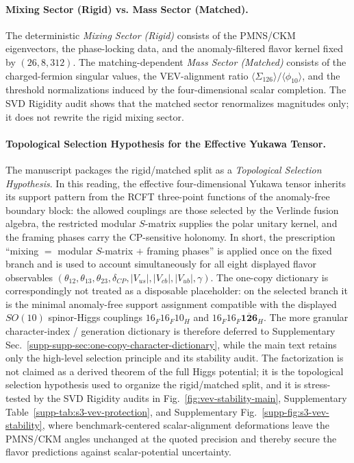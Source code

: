 \documentclass[11pt]{article}
\begin{document}
\paragraph{Mixing Sector (Rigid) vs. Mass Sector (Matched).}
The deterministic \emph{Mixing Sector (Rigid)} consists of the PMNS/CKM
eigenvectors, the phase-locking data, and the anomaly-filtered flavor kernel
fixed by $(26,8,312)$. The matching-dependent \emph{Mass Sector (Matched)}
consists of the charged-fermion singular values, the VEV-alignment ratio
$\langle \Sigma_{126} \rangle / \langle \phi_{10} \rangle$, and the threshold
normalizations induced by the four-dimensional scalar completion. The SVD Rigidity audit
shows that the matched sector renormalizes magnitudes only; it does not rewrite
the rigid mixing sector.

\paragraph{Topological Selection Hypothesis for the Effective Yukawa Tensor.}
The manuscript packages the rigid/matched split as a \emph{Topological Selection Hypothesis}. In this reading, the effective four-dimensional Yukawa tensor inherits its support pattern from the RCFT three-point functions of the anomaly-free boundary block: the allowed couplings are those selected by the Verlinde fusion algebra, the restricted modular $S$-matrix supplies the polar unitary kernel, and the framing phases carry the CP-sensitive holonomy. In short, the prescription ``mixing $=$ modular $S$-matrix $+$ framing phases'' is applied once on the fixed branch and is used to account simultaneously for all eight displayed flavor observables $(\theta_{12},\theta_{13},\theta_{23},\delta_{CP},|V_{us}|,|V_{cb}|,|V_{ub}|,\gamma)$. The one-copy dictionary is correspondingly not treated as a disposable placeholder: on the selected branch it is the minimal anomaly-free support assignment compatible with the displayed $SO(10)$ spinor-Higgs couplings $16_F16_F10_H$ and $16_F16_F\overline{\mathbf{126}}_H$. The more granular character-index / generation dictionary is therefore deferred to Supplementary Sec.~\ref{supp-supp-sec:one-copy-character-dictionary}, while the main text retains only the high-level selection principle and its stability audit. The factorization is not claimed as a derived theorem of the full Higgs potential; it is the topological selection hypothesis used to organize the rigid/matched split, and it is stress-tested by the SVD Rigidity audits in Fig.~\ref{fig:vev-stability-main}, Supplementary Table~\ref{supp-tab:s3-vev-protection}, and Supplementary Fig.~\ref{supp-fig:s3-vev-stability}, where benchmark-centered scalar-alignment deformations leave the PMNS/CKM angles unchanged at the quoted precision and thereby secure the flavor predictions against scalar-potential uncertainty.
\end{document}
